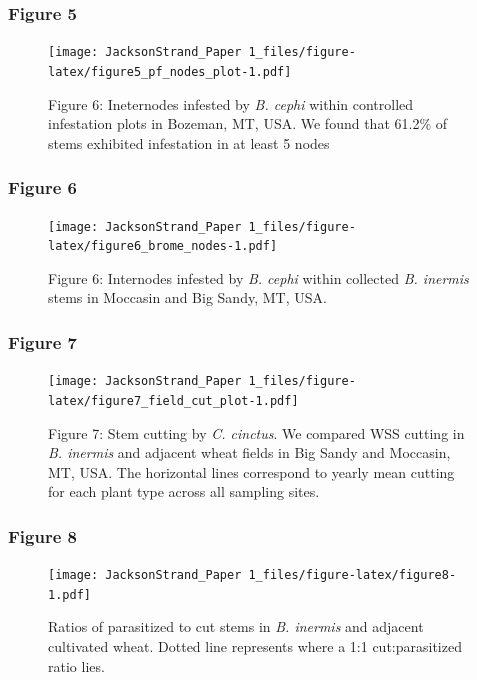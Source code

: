 \documentclass[
]{article}
\begin{document}
\subsubsection{Figure 5}\label{figure5}

\begin{figure}
\centering
\texttt{[image: JacksonStrand\_Paper 1\_files/figure-latex/figure5\_pf\_nodes\_plot-1.pdf]}
\caption{Figure 6: Ineternodes infested by \emph{B. cephi} within
controlled infestation plots in Bozeman, MT, USA. We found that 61.2\%
of stems exhibited infestation in at least 5 nodes}
\end{figure}

\subsubsection{Figure 6}\label{figure6}

\begin{figure}
\centering
\texttt{[image: JacksonStrand\_Paper 1\_files/figure-latex/figure6\_brome\_nodes-1.pdf]}
\caption{Figure 6: Internodes infested by \emph{B. cephi} within
collected \emph{B. inermis} stems in Moccasin and Big Sandy, MT, USA.}
\end{figure}

\subsubsection{Figure 7}\label{figure7}

\begin{figure}
\centering
\texttt{[image: JacksonStrand\_Paper 1\_files/figure-latex/figure7\_field\_cut\_plot-1.pdf]}
\caption{Figure 7: Stem cutting by \emph{C. cinctus}. We compared WSS
cutting in \emph{B. inermis} and adjacent wheat fields in Big Sandy and
Moccasin, MT, USA. The horizontal lines correspond to yearly mean
cutting for each plant type across all sampling sites.}
\end{figure}

\subsubsection{Figure 8}\label{figure8}

\begin{figure}
\centering
\texttt{[image: JacksonStrand\_Paper 1\_files/figure-latex/figure8-1.pdf]}
\caption{Ratios of parasitized to cut stems in \emph{B. inermis} and
adjacent cultivated wheat. Dotted line represents where a 1:1
cut:parasitized ratio lies.}
\end{figure}
\end{document}
